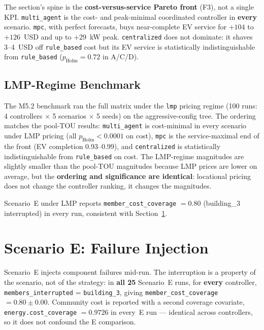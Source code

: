 The section's spine is the \textbf{cost-versus-service Pareto front} (F3), not
a single KPI. \texttt{multi\_agent} is the cost- and peak-minimal coordinated
controller in \textbf{every} scenario. \texttt{mpc}, with perfect forecasts,
buys near-complete EV service for $+104$ to $+126$~USD and up to $+29$~kW peak.
\texttt{centralized} does not dominate: it shaves 3--4~USD off
\texttt{rule\_based} cost but its EV service is statistically indistinguishable
from \texttt{rule\_based} ($p_{\mathrm{Holm}} = 0.72$ in A/C/D).

\subsection{LMP-Regime Benchmark}\label{sec:lmp}

The M5.2 benchmark ran the full matrix under the \texttt{lmp} pricing regime
(100 runs: 4 controllers $\times$ 5 scenarios $\times$ 5 seeds) on the
aggressive-config tree. The ordering matches the pool-TOU results:
\texttt{multi\_agent} is cost-minimal in every scenario under LMP pricing
(all $p_{\mathrm{Holm}} < 0.0001$ on cost), \texttt{mpc} is the
service-maximal end of the front (EV completion 0.93--0.99), and
\texttt{centralized} is statistically indistinguishable from
\texttt{rule\_based} on cost. The LMP-regime magnitudes are slightly smaller
than the pool-TOU magnitudes because LMP prices are lower on average, but the
\textbf{ordering and significance are identical}: locational pricing does not
change the controller ranking, it changes the magnitudes.

Scenario~E under LMP reports \texttt{member\_cost\_coverage} $= 0.80$
(building\_3 interrupted) in every run, consistent with
Section~\ref{sec:scenarioe}.

\section{Scenario E: Failure Injection}\label{sec:scenarioe}

Scenario~E injects component failures mid-run. The interruption is a property
of the scenario, not of the strategy: in \textbf{all 25} Scenario~E runs, for
\textbf{every} controller, \texttt{members\_interrupted} =
\texttt{building\_3}, giving \texttt{member\_cost\_coverage} $= 0.80 \pm 0.00$.
Community cost is reported with a second coverage covariate,
\texttt{energy.cost\_coverage} $= 0.9726$ in every~E run --- identical across
controllers, so it does not confound the E comparison.

